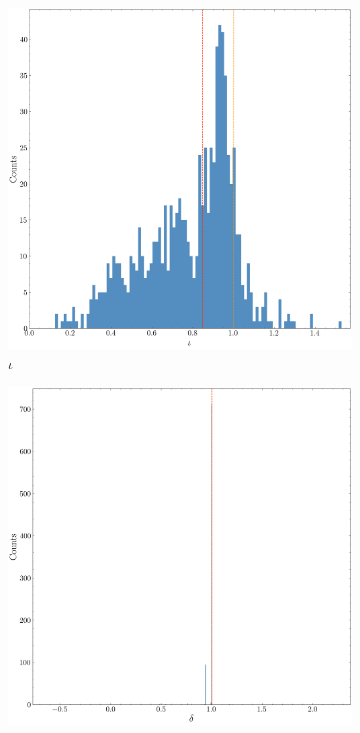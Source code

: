 \documentclass[fleqn,usenatbib,useAMS]{mnras}
\begin{document}
\begin{figure}
		\begin{subfigure}[b]{0.3\textwidth}
		\includegraphics[width=\textwidth]{images/distribution_iota_gw}
		\caption{$\iota$}
	\end{subfigure}
	\hfill
	\begin{subfigure}[b]{0.3\textwidth}
		\includegraphics[width=\textwidth]{images/distribution_delta_gw}

\end{subfigure}
\end{figure}
\end{document}
